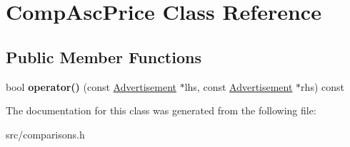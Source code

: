 \hypertarget{class_comp_asc_price}{}\section{Comp\+Asc\+Price Class Reference}
\label{class_comp_asc_price}
\subsection*{Public Member Functions}
\begin{DoxyCompactItemize}
\item 
\hypertarget{class_comp_asc_price_add99ade899f076ae21a06f648627e974}{}bool {\bfseries operator()} (const \hyperlink{class_advertisement}{Advertisement} $\ast$lhs, const \hyperlink{class_advertisement}{Advertisement} $\ast$rhs) const \label{class_comp_asc_price_add99ade899f076ae21a06f648627e974}

\end{DoxyCompactItemize}


The documentation for this class was generated from the following file\+:\begin{DoxyCompactItemize}
\item 
src/comparisons.\+h\end{DoxyCompactItemize}
